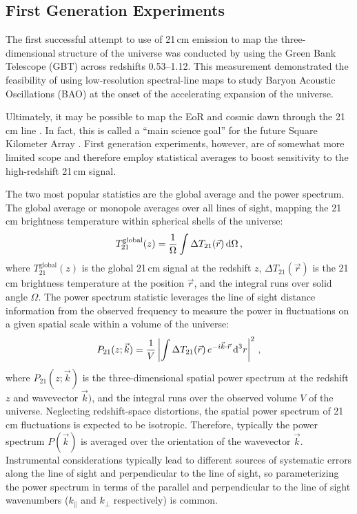 \begin{bibunit}
\section{First Generation Experiments}

The first successful attempt to use of 21\,cm emission to map the three-dimensional structure of the
universe was conducted by \citet{2010Natur.466..463C} using the Green Bank Telescope (GBT) across
redshifts 0.53--1.12. This measurement demonstrated the feasibility of using low-resolution
spectral-line maps to study Baryon Acoustic Oscillations (BAO) at the onset of the accelerating
expansion of the universe.

Ultimately, it may be possible to map the EoR and cosmic dawn through the 21\,cm line
\citep{1997ApJ...475..429M}. In fact, this is called a ``main science goal'' for the future Square
Kilometer Array \citep[SKA;][]{2013ExA....36..235M}.  First generation experiments, however, are of
somewhat more limited scope and therefore employ statistical averages to boost sensitivity to the
high-redshift 21\,cm signal.

The two most popular statistics are the global average and the power spectrum. The global average or
monopole averages over all lines of sight, mapping the 21\,cm brightness temperature within
spherical shells of the universe:
\begin{equation}
    T^\text{global}_{21}(z) = \frac{1}{\Omega}\int \Delta T_{21}(\vec{r}) \, {\textrm d}\Omega \,,
\end{equation}
where $T^\text{global}_{21}(z)$ is the global 21\,cm signal at the redshift $z$, $\Delta
T_{21}(\vec{r})$ is the 21\,cm brightness temperature at the position $\vec{r}$, and the integral
runs over solid angle $\Omega$.  The power spectrum statistic leverages the line of sight distance
information from the observed frequency to measure the power in fluctuations on a given spatial
scale within a volume of the universe:
\begin{equation}
    P_{21}(z; \vec{k}) =
        \frac{1}{V}\left|
        \int \Delta T_{21}(\vec{r}) \, e^{-i\vec{k}\cdot\vec{r}} \, {\textrm d}^3r
        \right|^2\,,
\end{equation}
where $P_{21}(z; \vec{k})$ is the three-dimensional spatial power spectrum at the redshift $z$ and
wavevector $\vec{k})$, and the integral runs over the observed volume $V$ of the universe.
Neglecting redshift-space distortions, the spatial power spectrum of 21\,cm fluctuations is expected
to be isotropic. Therefore, typically the power spectrum $P(\vec{k})$ is averaged over the
orientation of the wavevector $\vec{k}$. Instrumental considerations typically lead to different
sources of systematic errors along the line of sight and perpendicular to the line of sight, so
parameterizing the power spectrum in terms of the parallel and perpendicular to the line of sight
wavenumbers ($k_\parallel$ and $k_\perp$ respectively) is common.


\end{bibunit}
